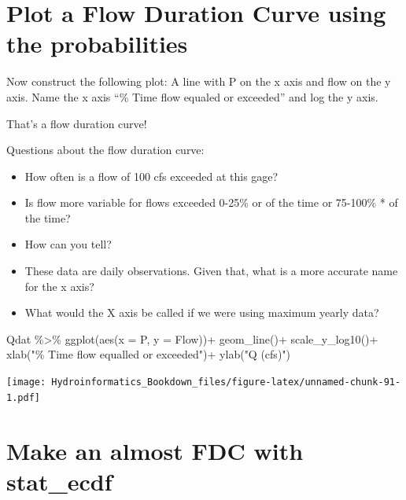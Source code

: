 \documentclass[
]{book}
\newenvironment{Shaded}{\begin{snugshade}}{\end{snugshade}}
\newcommand{\AttributeTok}[1]{\textcolor[rgb]{0.77,0.63,0.00}{#1}}
\newcommand{\FunctionTok}[1]{\textcolor[rgb]{0.00,0.00,0.00}{#1}}
\newcommand{\NormalTok}[1]{#1}
\newcommand{\SpecialCharTok}[1]{\textcolor[rgb]{0.00,0.00,0.00}{#1}}
\newcommand{\StringTok}[1]{\textcolor[rgb]{0.31,0.60,0.02}{#1}}
\providecommand{\tightlist}{%
  \setlength{\itemsep}{0pt}\setlength{\parskip}{0pt}}
\begin{document}
\hypertarget{plot-a-flow-duration-curve-using-the-probabilities}{%
\section{Plot a Flow Duration Curve using the probabilities}\label{plot-a-flow-duration-curve-using-the-probabilities}}

Now construct the following plot: A line with P on the x axis and flow on the y axis. Name the x axis ``\% Time flow equaled or exceeded'' and log the y axis.

That's a flow duration curve!

Questions about the flow duration curve:

\begin{itemize}
\tightlist
\item
  How often is a flow of 100 cfs exceeded at this gage?
\item
  Is flow more variable for flows exceeded 0-25\% or of the time or 75-100\% * of the time?
\item
  How can you tell?
\item
  These data are daily observations. Given that, what is a more accurate name for the x axis?
\item
  What would the X axis be called if we were using maximum yearly data?
\end{itemize}

\begin{Shaded}
\begin{Highlighting}[]
\NormalTok{Qdat }\SpecialCharTok{\%\textgreater{}\%} \FunctionTok{ggplot}\NormalTok{(}\FunctionTok{aes}\NormalTok{(}\AttributeTok{x =}\NormalTok{ P, }\AttributeTok{y =}\NormalTok{ Flow))}\SpecialCharTok{+}
  \FunctionTok{geom\_line}\NormalTok{()}\SpecialCharTok{+}
  \FunctionTok{scale\_y\_log10}\NormalTok{()}\SpecialCharTok{+}
  \FunctionTok{xlab}\NormalTok{(}\StringTok{"\% Time flow equalled or exceeded"}\NormalTok{)}\SpecialCharTok{+}
  \FunctionTok{ylab}\NormalTok{(}\StringTok{"Q (cfs)"}\NormalTok{)}
\end{Highlighting}
\end{Shaded}

\texttt{[image: Hydroinformatics\_Bookdown\_files/figure-latex/unnamed-chunk-91-1.pdf]}

\hypertarget{make-an-almost-fdc-with-stat_ecdf}{%
\section{Make an almost FDC with stat\_ecdf}\label{make-an-almost-fdc-with-stat_ecdf}}
\end{document}
